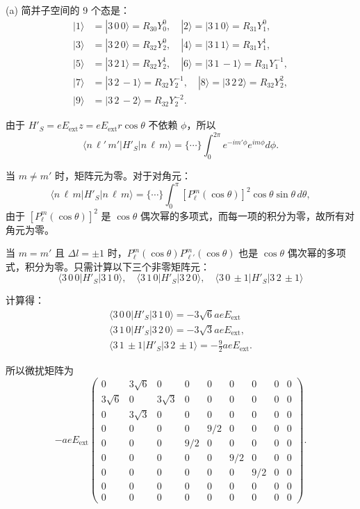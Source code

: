 (a) 简并子空间的 9 个态是：
\begin{align*}
	|1\rangle &= |3\,0\,0\rangle = R_{30}Y_0^0, \quad
	|2\rangle = |3\,1\,0\rangle = R_{31}Y_1^0, \\
	|3\rangle &= |3\,2\,0\rangle = R_{32}Y_2^0, \quad
	|4\rangle = |3\,1\,1\rangle = R_{31}Y_1^1, \\
	|5\rangle &= |3\,2\,1\rangle = R_{32}Y_2^1, \quad
	|6\rangle = |3\,1\,-1\rangle = R_{31}Y_1^{-1}, \\
	|7\rangle &= |3\,2\,-1\rangle = R_{32}Y_2^{-1}, \quad
	|8\rangle = |3\,2\,2\rangle = R_{32}Y_2^2, \\
	|9\rangle &= |3\,2\,-2\rangle = R_{32}Y_2^{-2}.
\end{align*}

由于 $H'_S = e E_{\mathrm{ext}} z = e E_{\mathrm{ext}} r \cos\theta$ 不依赖 $\phi$，所以
\[
\langle n\,\ell'\,m' | H'_S | n\,\ell\,m \rangle = \{\cdots\} \int_0^{2\pi} e^{-im'\phi} e^{im\phi} d\phi.
\]

当 $m \ne m'$ 时，矩阵元为零。对于对角元：
\[
\langle n\,\ell\,m | H'_S | n\,\ell\,m \rangle = \{\cdots\} \int_0^\pi [P_\ell^m(\cos\theta)]^2 \cos\theta \sin\theta\,d\theta,
\]
由于 $[P_\ell^m(\cos\theta)]^2$ 是 $\cos\theta$ 偶次幂的多项式，而每一项的积分为零，故所有对角元为零。

当 $m = m'$ 且 $\Delta l =  \pm 1$ 时，$P_\ell^m(\cos\theta) P_{\ell'}^m(\cos\theta)$ 也是 $\cos\theta$ 偶次幂的多项式，积分为零。只需计算以下三个非零矩阵元：
\[
\langle 3\,0\,0 | H'_S | 3\,1\,0 \rangle , \quad
\langle 3\,1\,0 | H'_S | 3\,2\,0 \rangle, \quad
\langle 3\,0\,\pm1 | H'_S | 3\,2\,\pm1 \rangle
\]

计算得：
\[\begin{array}{l}
	\langle 3\,0\,0 | H'_S | 3\,1\,0 \rangle = -3\sqrt{6}a e E_{\mathrm{ext}}\\
	\langle 3\,1\,0 | H'_S | 3\,2\,0 \rangle = -3\sqrt{3}a e E_{\mathrm{ext}},\\
	\displaystyle \langle 3\,1\,\pm1 | H'_S | 3\,2\,\pm1 \rangle = -\frac{9}{2}a e E_{\mathrm{ext}}.
\end{array}\]

所以微扰矩阵为
\[
-a e E_{\mathrm{ext}}
\begin{pmatrix}
	0 & 3\sqrt{6} & 0 & 0 & 0 & 0 & 0 & 0 & 0 \\
	3\sqrt{6} & 0 & 3\sqrt{3} & 0 & 0 & 0 & 0 & 0 & 0 \\
	0 & 3\sqrt{3} & 0 & 0 & 0 & 0 & 0 & 0 & 0 \\
	0 & 0 & 0 & 0 & 9/2 & 0 & 0 & 0 & 0 \\
	0 & 0 & 0 & 9/2 & 0 & 0 & 0 & 0 & 0 \\
	0 & 0 & 0 & 0 & 0 & 9/2 & 0 & 0 & 0 \\
	0 & 0 & 0 & 0 & 0 & 0 & 9/2 & 0 & 0 \\
	0 & 0 & 0 & 0 & 0 & 0 & 0 & 0 & 0 \\
	0 & 0 & 0 & 0 & 0 & 0 & 0 & 0 & 0
\end{pmatrix}.
\]

